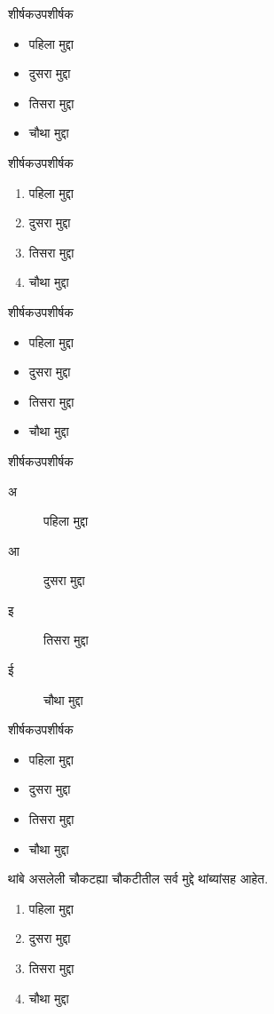     \maketitle
    \begin{frame}{शीर्षक}{उपशीर्षक}
        \begin{itemize}
            \item पहिला मुद्दा
            \item दुसरा मुद्दा
            \item तिसरा मुद्दा
            \item चौथा मुद्दा
        \end{itemize}
    \end{frame}
    \begin{frame}{शीर्षक}{उपशीर्षक}
        \begin{enumerate}
            \item पहिला मुद्दा
            \item दुसरा मुद्दा
            \item तिसरा मुद्दा
            \item चौथा मुद्दा
        \end{enumerate}
    \end{frame}
    \begin{frame}{शीर्षक}{उपशीर्षक}
        \begin{itemize}
            \item पहिला मुद्दा
            \item दुसरा मुद्दा
            \item तिसरा मुद्दा
            \item चौथा मुद्दा
        \end{itemize}
    \end{frame}
    \begin{frame}{शीर्षक}{उपशीर्षक}
        \begin{description}
            \item[अ] पहिला मुद्दा
            \item[आ] दुसरा मुद्दा
            \item[इ] तिसरा मुद्दा
            \item[ई] चौथा मुद्दा
        \end{description}
    \end{frame}
    \begin{frame}{शीर्षक}{उपशीर्षक}
    \begin{itemize}
        \item पहिला मुद्दा
        \item दुसरा मुद्दा
        \item तिसरा मुद्दा
        \item चौथा मुद्दा
    \end{itemize}
    \end{frame}
    \begin{frame}{थांबे असलेली चौकट}{ह्या चौकटीतील सर्व मुद्दे थांब्यांसह आहेत.}
        \begin{enumerate}
            \item<+-> पहिला मुद्दा
            \item<+-> दुसरा मुद्दा
            \item<+-> तिसरा मुद्दा
            \item<+-> चौथा मुद्दा
        \end{enumerate}
    \end{frame}
